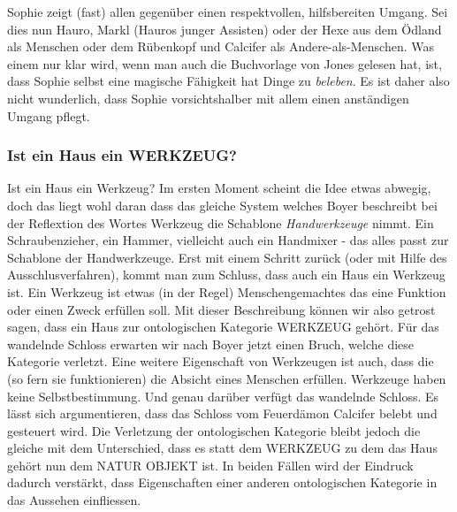 Sophie zeigt (fast) allen gegenüber einen respektvollen, hilfsbereiten Umgang. Sei dies nun Hauro, Markl (Hauros junger Assisten) oder der Hexe aus dem Ödland als Menschen oder dem Rübenkopf und Calcifer als Andere-als-Menschen. Was einem nur klar wird, wenn man auch die Buchvorlage von Jones gelesen hat, ist, dass Sophie selbst eine magische Fähigkeit hat Dinge zu \emph{beleben}. Es ist daher also nicht wunderlich, dass Sophie vorsichtshalber mit allem einen anständigen Umgang pflegt. 

\subsubsection{Ist ein Haus ein WERKZEUG?}
Ist ein Haus ein Werkzeug? Im ersten Moment scheint die Idee etwas abwegig, doch das liegt wohl daran dass das gleiche System welches Boyer beschreibt bei der Reflextion des Wortes Werkzeug die Schablone \emph{Handwerkzeuge} nimmt. Ein Schraubenzieher, ein Hammer, vielleicht auch ein Handmixer - das alles passt zur Schablone der Handwerkzeuge. Erst mit einem Schritt zurück (oder mit Hilfe des Ausschlusverfahren), kommt man zum Schluss, dass auch ein Haus ein Werkzeug ist. Ein Werkzeug ist etwas (in der Regel) Menschengemachtes das eine Funktion oder einen Zweck erfüllen soll. Mit dieser Beschreibung können wir also getrost sagen, dass ein Haus zur ontologischen Kategorie WERKZEUG gehört. Für das wandelnde Schloss erwarten wir nach Boyer jetzt einen Bruch, welche diese Kategorie verletzt. Eine weitere Eigenschaft von Werkzeugen ist auch, dass die (so fern sie funktionieren) die Absicht eines Menschen erfüllen. Werkzeuge haben keine Selbstbestimmung. Und genau darüber verfügt das wandelnde Schloss. Es lässt sich argumentieren, dass das Schloss vom Feuerdämon Calcifer belebt und gesteuert wird. Die Verletzung der ontologischen Kategorie bleibt jedoch die gleiche mit dem Unterschied, dass es statt dem WERKZEUG zu dem das Haus gehört nun dem NATUR OBJEKT ist. In beiden Fällen wird der Eindruck dadurch verstärkt, dass Eigenschaften einer anderen ontologischen Kategorie in das Aussehen einfliessen. 